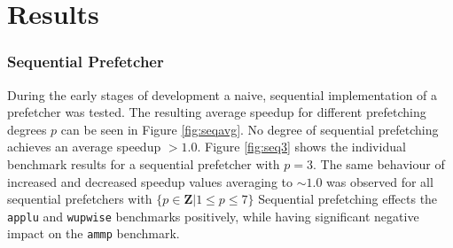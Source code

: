 \section{Results}
\label{sec:results}
%

\subsubsection{Sequential Prefetcher}
During the early stages of development a naive, sequential implementation of a prefetcher was tested.
The resulting average speedup for different prefetching degrees $p$ can be seen in Figure \ref{fig:seqavg}.
No degree of sequential prefetching achieves an average speedup $> 1.0$.
Figure \ref{fig:seq3} shows the individual benchmark results for a sequential prefetcher with $p = 3$.
The same behaviour of increased and decreased speedup values averaging to $\sim 1.0$ was observed for all sequential prefetchers with $\{p \in \mathbf{Z} | 1 \leq p \leq 7\}$
Sequential prefetching effects the \texttt{applu} and \texttt{wupwise} benchmarks positively, while having significant negative impact on the \texttt{ammp} benchmark.

\begin{figure*}
  
  \caption{Average speedup as a function of degree for the sequential prefetcher.}
  \label{fig:seqavg}
\end{figure*}

\begin{figure*}
  
  \caption{Performance of sequential prefetcher with $p = 3$ across benchmarks.}
  \label{fig:seq3}
\end{figure*}

